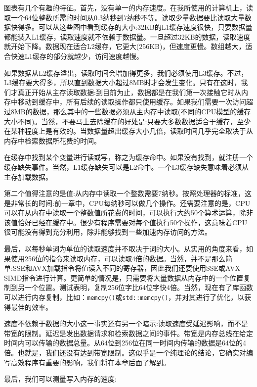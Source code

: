 图表有几个有趣的特征。首先，没有单一的内存速度。在我所使用的计算机上，读取一个64位整数所需的时间从0.3纳秒到7纳秒不等。读取少量数据要比读取大量数据快得多。可以从这些图中看到缓存的大小:32KB的L1缓存速度很快，只要数据量都能装入L1缓存，读取速度就不依赖于数据量。一旦超过32KB的数据，读取速度就开始下降。数据现在适合L2缓存，它更大(256KB)，但速度更慢。数组越大，适合快速L1缓存的部分就越少，访问速度越慢。

如果数据从L2缓存溢出，读取时间会增加得更多，我们必须使用L3缓存。不过，L3缓存要大得多，所以直到数据大小超过8MB时才会发生变化。只有在这时，我们才真正开始从主存读取数据:到目前为止，数据都是在我们第一次接触它时从内存中移动到缓存中，所有后续的读取操作都只使用缓存。如果我们需要一次访问超过8MB的数据，那么其中的一些数据必须从主内存中读取(不同的CPU模型的缓存大小不同)。当然，不要马上去除缓存的好处是:只要大多数数据适合于缓存，至少在某种程度上是有效的。当数据量超出缓存大小几倍，读取时间几乎完全取决于从内存中检索数据所花费的时间。

在缓存中找到某个变量进行读或写，称之为缓存命中。如果没有找到，就注册一个缓存缺失事件。当然，L1缓存缺失可以是L2命中。一个L3缓存缺失意味着必须从主存加载数据。

第二个值得注意的是值:从内存中读取一个整数需要7纳秒。按照处理器的标准，这是非常长的时间:前一章中，CPU每纳秒可以做几个操作。还需要注意的是，CPU可以在从内存中读取一个整数值所花费的时间，可以执行大约50个算术运算，除非该值恰好已经在缓存中。很少有程序需要对每个值执行50个操作，这意味着CPU很可能没有得到充分利用，除非能够找到一些加速内存访问的方法。

最后，以每秒单词为单位的读取速度并不取决于词的大小。从实用的角度来看，如果使用256位的指令来读取内存，可以读取4倍的数据。当然，并不是那么简单:SSE和AVX加载指令将值读入不同的寄存器，因此我们还要使用SSE或AVX SIMD指令进行计算。更简单的情况是，只需要将大量数据从内存中的一个位置复制到另一个位置。测试表明，复制256位字比64位字快4倍。当然，现在有了库函数可以进行内存复制，比如：\texttt{memcpy()}或\texttt{std::memcpy()}，并对其进行了优化，以获得最佳的效率。

速度不依赖于数据的大小这一事实还有另一个暗示:读取速度受延迟影响，而不是带宽的限制。延迟是发出数据请求和检索数据之间的事件。带宽是内存总线在给定时间内可以传输的数据总量。从64位到256位在同一时间内传输的数据是64位的4倍。也就是，我们还没有达到带宽限制。这似乎是一个纯理论的结论，它确实对编写高效程序有重要的影响，我们将在本章后面了解到。

最后，我们可以测量写入内存的速度:

